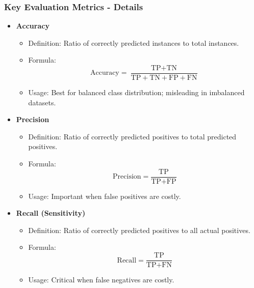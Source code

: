 \documentclass[aspectratio=169]{beamer}
\begin{document}
\begin{frame}[fragile]
    \frametitle{Key Evaluation Metrics - Details}
    \begin{itemize}
        \item \textbf{Accuracy}
        \begin{itemize}
            \item Definition: Ratio of correctly predicted instances to total instances.
            \item Formula: 
            \begin{equation}
            \text{Accuracy} = \frac{\text{TP} + \text{TN}}{\text{TP} + \text{TN} + \text{FP} + \text{FN}}
            \end{equation}
            \item Usage: Best for balanced class distribution; misleading in imbalanced datasets.
        \end{itemize}
        
        \item \textbf{Precision}
        \begin{itemize}
            \item Definition: Ratio of correctly predicted positives to total predicted positives.
            \item Formula: 
            \begin{equation}
            \text{Precision} = \frac{\text{TP}}{\text{TP} + \text{FP}}
            \end{equation}
            \item Usage: Important when false positives are costly.
        \end{itemize}
        
        \item \textbf{Recall (Sensitivity)}
        \begin{itemize}
            \item Definition: Ratio of correctly predicted positives to all actual positives.
            \item Formula: 
            \begin{equation}
            \text{Recall} = \frac{\text{TP}}{\text{TP} + \text{FN}}
            \end{equation}
            \item Usage: Critical when false negatives are costly.
        \end{itemize}
    \end{itemize}
\end{frame}
\end{document}

